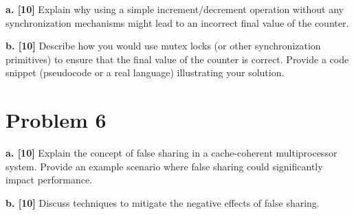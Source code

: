 \documentclass{article}
\begin{document}
\textbf{a. [10]} Explain why using a simple increment/decrement operation without any synchronization mechanisms might lead to an incorrect final value of the counter.

\textbf{b. [10]} Describe how you would use mutex locks (or other synchronization primitives) to ensure that the final value of the counter is correct. Provide a code snippet (pseudocode or a real language) illustrating your solution.


\section*{Problem 6}
\textbf{a. [10]} Explain the concept of false sharing in a cache-coherent multiprocessor system.  Provide an example scenario where false sharing could significantly impact performance.

\textbf{b. [10]} Discuss techniques to mitigate the negative effects of false sharing.

\end{document}
